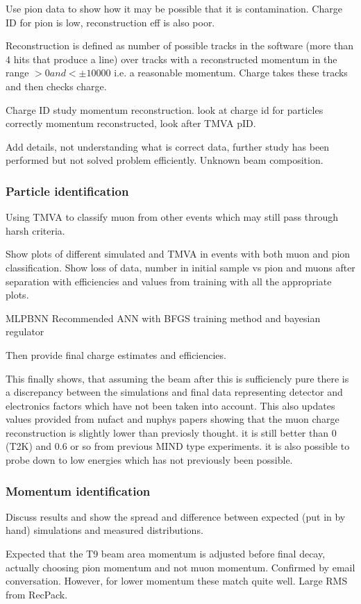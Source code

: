 Use pion data to show how it may be possible that it is contamination. Charge ID for pion is low, reconstruction eff is also poor.

Reconstruction is defined as number of possible tracks in the software (more than 4 hits that produce a line) over tracks with a reconstructed momentum in the range $>0 and <\pm 10000$ i.e. a reasonable momentum. Charge takes these tracks and then checks charge.

Charge ID study momentum reconstruction. look at charge id for particles correctly momentum reconstructed, look after TMVA pID. 


Add details, not understanding what is correct data, further study has been performed but not solved problem efficiently. Unknown beam composition.


\subsubsection{Particle identification}

Using TMVA to classify muon from other events which may still pass through harsh criteria. 

Show plots of different simulated and TMVA in events with both muon and pion classification. Show loss of data, number in initial sample vs pion and muons after separation with efficiencies and values from training with all the appropriate plots. 

MLPBNN Recommended ANN with BFGS training method and bayesian regulator

Then provide final charge estimates and efficiencies.

This finally shows, that assuming the beam after this is sufficiencly pure there is a discrepancy between the simulations and final data representing detector and electronics factors which have not been taken into account. This also updates values provided from nufact and nuphys papers showing that the muon charge reconstruction is slightly lower than previosly thought. it is still better than 0 (T2K) and 0.6 or so from previous MIND type experiments. it is also possible to probe down to low energies which has not previously been possible.

\subsubsection{Momentum identification}
Discuss results and show the spread and difference between expected (put in by hand) simulations and measured distributions. 

Expected that the T9 beam area momentum is adjusted before final decay, actually choosing pion momentum and not muon momentum. Confirmed by email conversation. However, for lower momentum these match quite well. Large RMS from RecPack.




